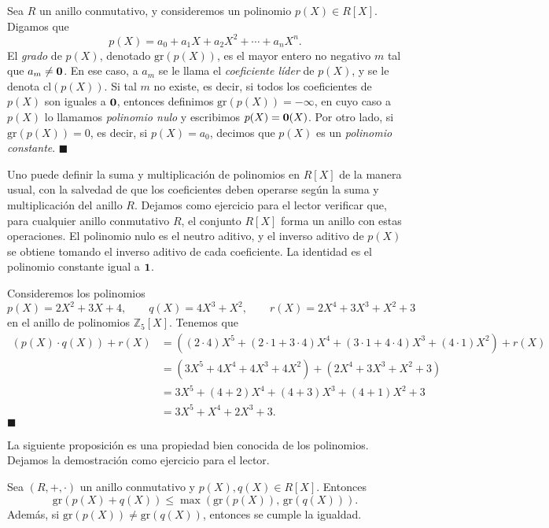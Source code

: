 \begin{definition}
Sea $R$ un anillo conmutativo, y consideremos un polinomio $p(X) \in R[X]$. Digamos que
$$p(X) = a_0 + a_1X + a_2X^2 + \cdots + a_n X^n.$$
El \emph{grado} de $p(X)$, denotado $\mathrm{gr}(p(X))$, es el mayor entero no negativo $m$ tal que $a_m \neq \mathbf{0}$. En ese caso, a $a_m$ se le llama el \emph{coeficiente líder} de $p(X)$, y se le denota $\mathrm{cl}(p(X))$. Si tal $m$ no existe, es decir, si todos los coeficientes de $p(X)$ son iguales a $\mathbf{0}$, entonces definimos $\mathrm{gr}(p(X)) = -\infty$, en cuyo caso a $p(X)$ lo llamamos \emph{polinomio nulo} y escribimos $p(X) = \mathbf{0}(X)$. Por otro lado, si $\mathrm{gr}(p(X)) = 0$, es decir, si $p(X) = a_0$, decimos que $p(X)$ es un \emph{polinomio constante}.
\hfill$\blacksquare$
\end{definition}

Uno puede definir la suma y multiplicación de polinomios en $R[X]$ de la manera usual, con la salvedad de que los coeficientes deben operarse según la suma y multiplicación del anillo $R$. Dejamos como ejercicio para el lector verificar que, para cualquier anillo conmutativo $R$, el conjunto $R[X]$ forma un anillo con estas operaciones. El polinomio nulo es el neutro aditivo, y el inverso aditivo de $p(X)$ se obtiene tomando el inverso aditivo de cada coeficiente. La identidad es el polinomio constante igual a $\mathbf{1}$.

\begin{example}
Consideremos los polinomios 
$$p(X) = 2X^2 + 3X + 4, \qquad q(X) = 4X^3 + X^2, \qquad r(X) = 2X^4 + 3X^3 + X^2 + 3$$
en el anillo de polinomios $\mathbb{Z}_5[X]$. Tenemos que
\begin{align*}
(p(X) \cdot q(X)) + r(X) &= \left((2 \cdot 4)X^5 + (2 \cdot 1 + 3 \cdot 4)X^4 + (3 \cdot 1 + 4 \cdot 4)X^3 + (4 \cdot 1)X^2 \right) + r(X) \\
&= (3X^5 + 4X^4 + 4X^3 + 4X^2) + (2X^4 + 3X^3 + X^2 + 3) \\
&= 3X^5 + (4 + 2)X^4 + (4 + 3)X^3 + (4 + 1)X^2 + 3 \\
&= 3X^5 + X^4 + 2X^3 + 3.
\end{align*}
\hfill$\blacksquare$
\end{example}

La siguiente proposición es una propiedad bien conocida de los polinomios. Dejamos la demostración como ejercicio para el lector.

\begin{proposition} \label{grado_suma}
Sea $(R, +, \cdot)$ un anillo conmutativo y $p(X), q(X) \in R[X]$. Entonces
$$\mathrm{gr}(p(X) + q(X)) \leq \max\left( \mathrm{gr}(p(X)),\, \mathrm{gr}(q(X))\right).$$
Además, si $\mathrm{gr}(p(X)) \neq \mathrm{gr}(q(X))$, entonces se cumple la igualdad.
\end{proposition}


